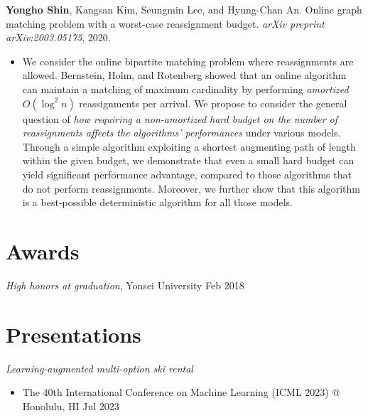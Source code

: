 \documentclass{article}
\newcommand{\killinitspace}{-0.7em}
\begin{document}
\textbf{Yongho Shin}, Kangsan Kim, Seungmin Lee, and Hyung-Chan An. Online graph matching problem with a worst-case reassignment budget. \emph{arXiv preprint arXiv:2003.05175}, 2020.
\vspace{\killinitspace}
\begin{itemize}
\item We consider the online bipartite matching problem where reassignments are allowed. Bernstein, Holm, and Rotenberg showed that an online algorithm can maintain a matching of maximum cardinality by performing \emph{amortized} $O(\log^2 n)$ reassignments per arrival. We propose to consider the general question of \emph{how requiring a \emph{non-amortized} hard budget on the number of reassignments affects the algorithms' performances} under various models. Through a simple algorithm exploiting a shortest augmenting path of length within the given budget, we demonstrate that even a small hard budget can yield significant performance advantage, compared to those algorithms that do not perform reassignments. Moreover, we further show that this algorithm is a best-possible deterministic algorithm for all those models.
\end{itemize}


\section{Awards}
\textsl{High honors at graduation}, Yonsei University \hfill Feb 2018

\section{Presentations}
\textsl{Learning-augmented multi-option ski rental}
\vspace{\killinitspace}
\begin{itemize}
\item The 40th International Conference on Machine Learning (ICML 2023) @ Honolulu, HI \hfill Jul 2023
\end{itemize}
\end{document}
